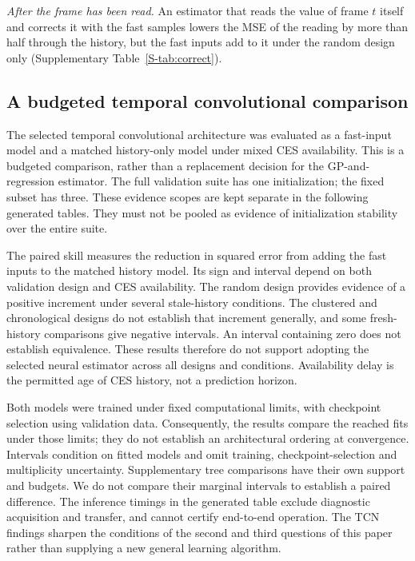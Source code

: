 \documentclass[11pt,a4paper]{article}
\newcommand{\SuppTab}[1]{Supplementary Table~\ref{S-#1}}
\begin{document}
\emph{After the frame has been read.} An estimator that reads the value of frame $t$
itself and corrects it with the fast samples lowers the MSE of the reading by more than
half through the history, but the fast inputs add to it under the random design only
(\SuppTab{tab:correct}).


\subsection{A budgeted temporal convolutional comparison}
\label{sec:res:tcn}
The selected temporal convolutional architecture was evaluated as a fast-input model and a matched history-only model under mixed CES availability. This is a budgeted comparison, rather than a replacement decision for the GP-and-regression estimator. The full validation suite has one initialization; the fixed subset has three. These evidence scopes are kept separate in the following generated tables. They must not be pooled as evidence of initialization stability over the entire suite.



The paired skill measures the reduction in squared error from adding the fast inputs to the matched history model. Its sign and interval depend on both validation design and CES availability. The random design provides evidence of a positive increment under several stale-history conditions. The clustered and chronological designs do not establish that increment generally, and some fresh-history comparisons give negative intervals. An interval containing zero does not establish equivalence. These results therefore do not support adopting the selected neural estimator across all designs and conditions. Availability delay is the permitted age of CES history, not a prediction horizon.

Both models were trained under fixed computational limits, with checkpoint selection using validation data. Consequently, the results compare the reached fits under those limits; they do not establish an architectural ordering at convergence. Intervals condition on fitted models and omit training, checkpoint-selection and multiplicity uncertainty. Supplementary tree comparisons have their own support and budgets. We do not compare their marginal intervals to establish a paired difference. The inference timings in the generated table exclude diagnostic acquisition and transfer, and cannot certify end-to-end operation. The TCN findings sharpen the conditions of the second and third questions of this paper rather than supplying a new general learning algorithm.
\end{document}
